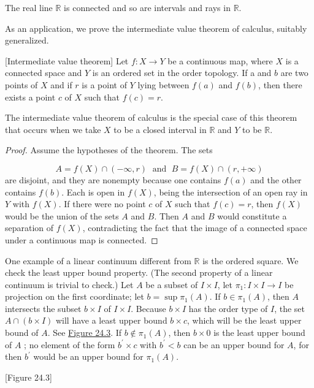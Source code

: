 \begin{corollary}
\label{cor:\thetheorem}
 The real line \(\mathbb{R}\) is connected and so are intervals and rays in \(\mathbb{R}\).
\end{corollary}

As an application, we prove the intermediate value theorem of calculus, suitably generalized.

\begin{theorem}
\label{thm:\thetheorem}[Intermediate value theorem]
 Let \(f : X \rightarrow Y\) be a continuous map, where \(X\) is a connected space and \(Y\) is an ordered set in the order topology. If a and \(b\) are two points of \(X\) and if \(r\) is a point of \(Y\) lying between \(f( a)\) and \(f( b)\), then there exists a point \(c\) of \(X\) such that \(f( c) = r\).

The intermediate value theorem of calculus is the special case of this theorem that occurs when we take \(X\) to be a closed interval in \(\mathbb{R}\) and \(Y\) to be \(\mathbb{R}\).

\end{theorem}
\begin{proof}
Assume the hypotheses of the theorem. The sets

\[
A = f( X) \cap ( {-\infty, r}) \;\text{ and }\;B = f( X) \cap ( {r, + \infty })
\]
are disjoint, and they are nonempty because one contains \(f( a)\) and the other contains \(f( b)\). Each is open in \(f( X)\), being the intersection of an open ray in \(Y\) with \(f( X)\). If there were no point \(c\) of \(X\) such that \(f( c) = r\), then \(f( X)\) would be the union of the sets \(A\) and \(B\). Then \(A\) and \(B\) would constitute a separation of \(f( X)\), contradicting the fact that the image of a connected space under a continuous map is connected.
\end{proof}

\begin{centeredblock}
\begin{example}
\label{ex:\thesection.\theexample}
 One example of a linear continuum different from \(\mathbb{R}\) is the ordered square. We check the least upper bound property. (The second property of a linear continuum is trivial to check.) Let \(A\) be a subset of \(I \times I\), let \({\pi }_{1} : I \times I \rightarrow I\) be projection on the first coordinate; let \(b = \sup {\pi }_{1}( A)\). If \(b \in {\pi }_{1}( A)\), then \(A\) intersects the subset \(b \times I\) of \(I \times I\). Because \(b \times I\) has the order type of \(I\), the set \(A \cap ( {b \times I})\) will have a least upper bound \(b \times c\), which will be the least upper bound of \(A\). See \hyperref[fig:24.3]{Figure 24.3}. If \(b \notin {\pi }_{1}( A)\), then \(b \times 0\) is the least upper bound of \(A\) ; no element of the form \(b^{\prime } \times c\) with \(b^{\prime } < b\) can be an upper bound for \(A\), for then \(b^{\prime }\) would be an upper bound for \({\pi }_{1}( A)\).

[Figure 24.3]
\end{example}
\end{centeredblock}


